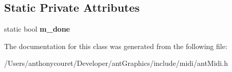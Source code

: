 \subsection*{Static Private Attributes}
\begin{DoxyCompactItemize}
\item 
\hypertarget{classant_midi_a936ada34eb4af9b1437e72bcfcf098d7}{static bool {\bfseries m\+\_\+done}}\label{classant_midi_a936ada34eb4af9b1437e72bcfcf098d7}

\end{DoxyCompactItemize}


The documentation for this class was generated from the following file\+:\begin{DoxyCompactItemize}
\item 
/\+Users/anthonycouret/\+Developer/ant\+Graphics/include/midi/ant\+Midi.\+h\end{DoxyCompactItemize}
